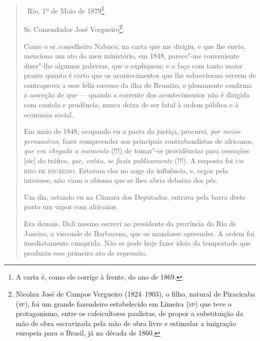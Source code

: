 \begin{quote}
\hfill\ Rio, 1º de Maio de 1879\footnote{A carta é, como ele corrige à
  frente, do ano de 1869.}\bigskip

\noindent{}Sr.\,Comendador José Vergueiro\footnote{Nicolau José de Campos
  Vergueiro (1824--1903), o filho, natural de Piracicaba (\textsc{sp}), foi um
  grande fazendeiro estabelecido em Limeira (\textsc{sp}) que teve o
  protagonismo, entre os cafeicultores paulistas, de propor a
  substituição da mão de obra escravizada pela mão de obra livre e
  estimular a imigração europeia para o Brasil, já na década de 1860.}.\smallskip

Como o sr.\,conselheiro Nabuco, na carta que me dirigiu, e que lhe envio,
menciona um ato do meu ministério, em 1848, parece"-me conveniente
dizer"-lhe algumas palavras, que o expliquem; e o faço com tanto maior
prazer quanto é certo que os acontecimentos que lhe sobrevieram servem
de contraprova a esse feliz sucesso da ilha de Reunião, e plenamente
confirma a asserção de que --- quando a corrente dos acontecimentos não
é dirigida com cautela e prudência, nunca deixa de ser fatal à ordem
pública e à economia social.

Em maio de 1848, ocupando eu a pasta da justiça, procurei, \emph{por
meios persuasivos}, fazer compreender aos principais contrabandistas de
africanos, \emph{que era chegado o momento} (!!!) de tomar"-se
providências para cessações {[}sic{]} do tráfico, \emph{que, então, se
fazia publicamente} (!!!). A resposta foi \textsc{um riso de escárnio}. Estavam
eles no auge da influência, e, cegos pelo interesse, não viam o abismo
que se lhes abria debaixo dos pés.

Um dia, estando eu na Câmara dos Deputados, entrava pela barra deste
porto um vapor com africanos.

Era demais. Dali mesmo escrevi ao presidente da província do Rio de
Janeiro, o visconde de Barbacena, que os mandasse apreender. A ordem foi
imediatamente cumprida. Não se pode hoje fazer ideia da tempestade que
produziu esse primeiro ato de repressão.


\end{quote}
